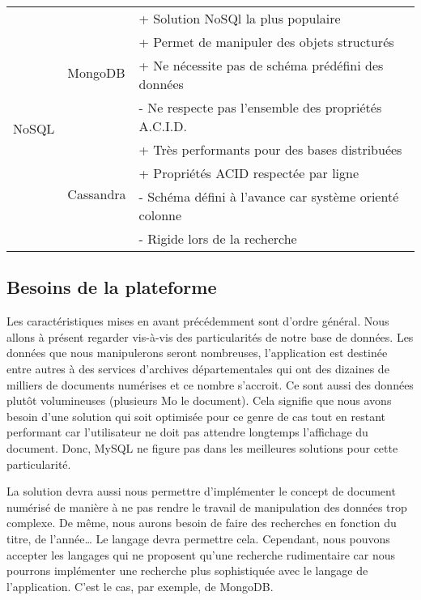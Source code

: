 \begin{center}
\begin{tabular}{|l|l|l|}
            \multirow{8}{*}{NoSQL} & \multirow{4}{*}{MongoDB} & + Solution NoSQl la plus populaire \\
            & & + Permet de manipuler des objets structurés \\
            & & + Ne nécessite pas de schéma prédéfini des données \\
            & & - Ne respecte pas l’ensemble des propriétés A.C.I.D. \\ \cline{2-3}
            & \multirow{4}{*}{Cassandra} & + Très performants pour des bases distribuées \\
            & & + Propriétés ACID respectée par ligne \\
            & & - Schéma défini à l’avance car système orienté colonne \\
            & & - Rigide lors de la recherche \\
            \hline
        \end{tabular}
        \end{center}

    \subsection{Besoins de la plateforme}
    \label{subsec:besoinplateforme}
    Les caractéristiques mises en avant précédemment sont d’ordre général. Nous allons à présent regarder
    vis-à-vis des particularités de notre base de données.
    Les données que nous manipulerons seront nombreuses, l’application est destinée entre autres
    à des services d’archives départementales qui ont des dizaines de milliers de documents numérises
    et ce nombre s’accroit. Ce sont aussi des données plutôt volumineuses (plusieurs Mo le document).
    Cela signifie que nous avons besoin d’une solution qui soit optimisée pour ce genre de cas tout en
    restant performant car l’utilisateur ne doit pas attendre longtemps l’affichage du document.
    Donc, MySQL ne figure pas dans les meilleures solutions pour cette particularité.

    La solution devra aussi nous permettre d’implémenter le concept de document numérisé de manière
    à ne pas rendre le travail de manipulation des données trop complexe. De même, nous aurons besoin
    de faire des recherches en fonction du titre, de l’année… Le langage devra permettre cela.
    Cependant, nous pouvons accepter les langages qui ne proposent qu’une recherche rudimentaire
    car nous pourrons implémenter une recherche plus sophistiquée avec le langage de l’application.
    C’est le cas, par exemple, de MongoDB.

